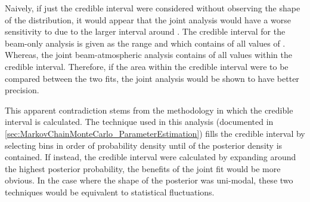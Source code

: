 Naively, if just the \quickmath{1\sigma} credible interval were considered without observing the shape of the distribution, it would appear that the joint analysis would have a worse sensitivity to  due to the larger interval around . The \quickmath{1\sigma} credible interval for the beam-only analysis is given as the range  and \quickmath{[2.64, \pi]} which contains  of all values of . Whereas, the joint beam-atmospheric analysis contains  of all  values within the \quickmath{1\sigma} credible interval. Therefore, if the area within the \quickmath{1\sigma} credible interval were to be compared between the two fits, the joint analysis would be shown to have better precision.

This apparent contradiction stems from the methodology in which the credible interval is calculated. The technique used in this analysis (documented in \autoref{sec:MarkovChainMonteCarlo_ParameterEstimation}) fills the credible interval by selecting bins in order of probability density until  of the posterior density is contained. If instead, the credible interval were calculated by expanding around the highest posterior probability, the benefits of the joint fit would be more obvious. In the case where the shape of the posterior was uni-modal, these two techniques would be equivalent to statistical fluctuations.

